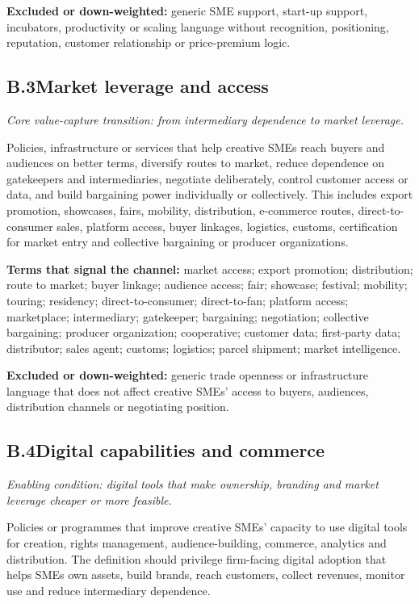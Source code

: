 \textbf{Excluded or down-weighted:} generic SME support, start-up support, incubators, productivity or scaling language without recognition, positioning, reputation, customer relationship or price-premium logic.

\subsection*{B.3\quad Market leverage and access}
\emph{Core value-capture transition: from intermediary dependence to market leverage.}

Policies, infrastructure or services that help creative SMEs reach buyers and audiences on better terms, diversify routes to market, reduce dependence on gatekeepers and intermediaries, negotiate deliberately, control customer access or data, and build bargaining power individually or collectively. This includes export promotion, showcases, fairs, mobility, distribution, e-commerce routes, direct-to-consumer sales, platform access, buyer linkages, logistics, customs, certification for market entry and collective bargaining or producer organizations.

\textbf{Terms that signal the channel:} market access; export promotion; distribution; route to market; buyer linkage; audience access; fair; showcase; festival; mobility; touring; residency; direct-to-consumer; direct-to-fan; platform access; marketplace; intermediary; gatekeeper; bargaining; negotiation; collective bargaining; producer organization; cooperative; customer data; first-party data; distributor; sales agent; customs; logistics; parcel shipment; market intelligence.

\textbf{Excluded or down-weighted:} generic trade openness or infrastructure language that does not affect creative SMEs' access to buyers, audiences, distribution channels or negotiating position.

\subsection*{B.4\quad Digital capabilities and commerce}
\emph{Enabling condition: digital tools that make ownership, branding and market leverage cheaper or more feasible.}

Policies or programmes that improve creative SMEs' capacity to use digital tools for creation, rights management, audience-building, commerce, analytics and distribution. The definition should privilege firm-facing digital adoption that helps SMEs own assets, build brands, reach customers, collect revenues, monitor use and reduce intermediary dependence.

